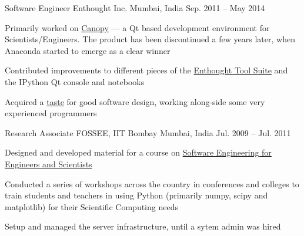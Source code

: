 \begin{cventries}
  \cventry
    {Software Engineer} %
    {Enthought Inc. } %
    {Mumbai, India} %
    {Sep. 2011 -- May 2014} %
    {
      \begin{cvitems} %
        \item {Primarily worked on \href{https://web.archive.org/web/20170621202502/https://www.enthought.com/products/canopy/}{Canopy} --- a Qt based development environment for Scientists/Engineers. The product has been discontinued a few years later, when Anaconda started to emerge as a clear winner}
        \item {Contributed improvements to different pieces of the \href{https://docs.enthought.com/ets/}{Enthought Tool Suite} and the IPython Qt console and notebooks}
        \item {Acquired a \href{https://rawgit.com/punchagan/340e1350fdfc766c6599/raw/ca1f5fe9bfc1cc503cd8a524e350bd29e8f5f33d/month-with-martin.html}{taste} for good software design, working along-side some very experienced programmers}
      \end{cvitems}
    }

  \cventry
    {Research Associate} %
    {FOSSEE, IIT Bombay } %
    {Mumbai, India} %
    {Jul. 2009 -- Jul. 2011} %
    {
      \begin{cvitems} %
        \item {Designed and developed material for a course on \href{https://github.com/FOSSEE/sees}{Software Engineering for Engineers and Scientists}}
        \item {Conducted a series of workshops across the country in conferences and colleges to train students and teachers in using Python (primarily numpy, scipy and matplotlib) for their Scientific Computing needs}
        \item {Setup and managed the server infrastructure, until a sytem admin was hired}
      \end{cvitems}
    }

\end{cventries}
